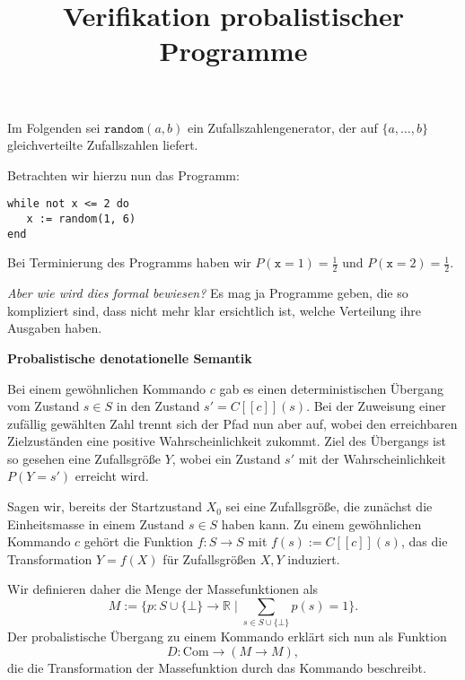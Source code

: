 \documentclass[8pt,fleqn,aspectratio=169]{beamer}
\title{Verifikation probalistischer Programme}
\date{}
\newcommand{\strong}[1]{\textsf{\textbf{#1}}}
\newcommand{\centerheadline}[1]{%
  \begin{center}\strong{#1}\end{center}}
\newcommand{\parspace}{\vspace{0.8em}}
\newcommand{\qb}[1]{[\!\![#1]\!\!]}
\newcommand{\R}{\mathbb R}
\begin{document}
\begin{frame}
\maketitle
\end{frame}

\begin{frame}[fragile]
Im Folgenden sei $\mathtt{random}(a,b)$ ein Zufallszahlengenerator, 
der auf $\{a,\ldots,b\}$ gleichverteilte Zufallszahlen liefert.\pause

\parspace
Betrachten wir hierzu nun das Programm:
\begin{lstlisting}[language=IMP, xleftmargin=\mathindent]
while not x <= 2 do
   x := random(1, 6)
end
\end{lstlisting}
Bei Terminierung des Programms haben wir $P(\mathtt x=1)=\tfrac{1}{2}$
und $P(\mathtt x=2)=\tfrac{1}{2}$.

\parspace
\emph{Aber wie wird dies formal bewiesen?} Es mag ja Programme geben,
die so kompliziert sind, dass nicht mehr klar ersichtlich ist, welche
Verteilung ihre Ausgaben haben.
\end{frame}

\begin{frame}
\centerheadline{Probalistische denotationelle Semantik}
\end{frame}

\begin{frame}
Bei einem gewöhnlichen Kommando $c$ gab es einen deterministischen
Übergang vom Zustand $s\in S$ in den Zustand $s'=C\qb{c}(s)$. Bei der
Zuweisung einer zufällig gewählten Zahl trennt sich der Pfad nun aber
auf, wobei den erreichbaren Zielzuständen eine positive Wahrscheinlichkeit
zukommt. Ziel des Übergangs ist so gesehen eine Zufallsgröße $Y$, wobei
ein Zustand $s'$ mit der Wahrscheinlichkeit $P(Y=s')$ erreicht wird.\pause

\parspace
Sagen wir, bereits der Startzustand $X_0$ sei eine Zufallsgröße, die zunächst
die Einheitsmasse in einem Zustand $s\in S$ haben kann. Zu einem gewöhnlichen
Kommando $c$ gehört die Funktion $f\colon S\to S$ mit $f(s):=C\qb{c}(s)$,
das die Transformation $Y=f(X)$ für Zufallsgrößen $X,Y$ induziert.\pause

\parspace
Wir definieren daher die Menge der Massefunktionen als
\[M := \{p\colon S\cup\{\bot\}\to\R\mid \sum_{s\in S\cup\{\bot\}} p(s) = 1\}.\]
Der probalistische Übergang zu einem Kommando erklärt sich nun als Funktion
\[D\colon\mathrm{Com}\to (M\to M),\]
die die Transformation der Massefunktion durch das Kommando beschreibt.
\end{frame}
\end{document}

